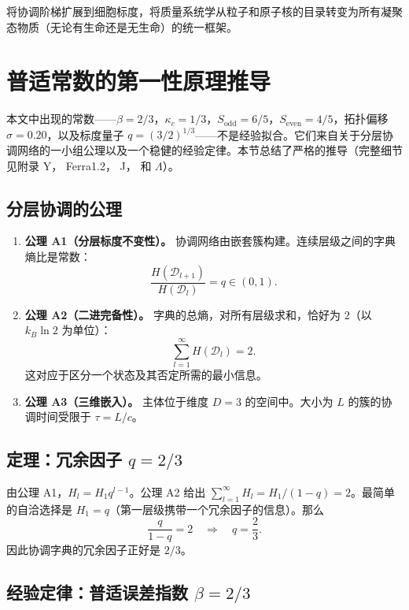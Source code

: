 \documentclass[11pt,a4paper]{article}
\begin{document}
	将协调阶梯扩展到细胞标度，将质量系统学从粒子和原子核的目录转变为所有凝聚态物质（无论有生命还是无生命）的统一框架。
	
	\section{普适常数的第一性原理推导}
	\label{sec:first-principles}
	
	本文中出现的常数——\(\beta = 2/3\)，\(\kappa_c = 1/3\)，\(S_{\mathrm{odd}}=6/5\)，\(S_{\mathrm{even}}=4/5\)，拓扑偏移 \(\sigma = 0.20\)，以及标度量子 \(q = (3/2)^{1/3}\)——不是经验拟合。它们来自关于分层协调网络的一小组公理以及一个稳健的经验定律。本节总结了严格的推导（完整细节见附录 Y， Ferra1.2， J， 和 \(\Lambda\)）。
	
	\subsection{分层协调的公理}
	
	\begin{enumerate}
		\item \textbf{公理 A1（分层标度不变性）。} 协调网络由嵌套簇构建。连续层级之间的字典熵比是常数：
		\[
		\frac{H(\mathcal{D}_{l+1})}{H(\mathcal{D}_l)} = q \in (0,1).
		\]
		
		\item \textbf{公理 A2（二进完备性）。} 字典的总熵，对所有层级求和，恰好为 \(2\)（以 \(k_B\ln 2\) 为单位）：
		\[
		\sum_{l=1}^{\infty} H(\mathcal{D}_l) = 2.
		\]
		这对应于区分一个状态及其否定所需的最小信息。
		
		\item \textbf{公理 A3（三维嵌入）。} 主体位于维度 \(D=3\) 的空间中。大小为 \(L\) 的簇的协调时间受限于 \(\tau = L/c\)。
	\end{enumerate}
	
	\subsection{定理：冗余因子 \(q = 2/3\)}
	
	由公理 A1，\(H_l = H_1 q^{l-1}\)。公理 A2 给出 \(\sum_{l=1}^\infty H_l = H_1/(1-q) = 2\)。最简单的自洽选择是 \(H_1 = q\)（第一层级携带一个冗余因子的信息）。那么
	\[
	\frac{q}{1-q} = 2 \quad\Longrightarrow\quad \boxed{q = \frac{2}{3}}.
	\]
	因此协调字典的冗余因子正好是 \(2/3\)。
	
	\subsection{经验定律：普适误差指数 \(\beta = 2/3\)}
	
\end{document}
